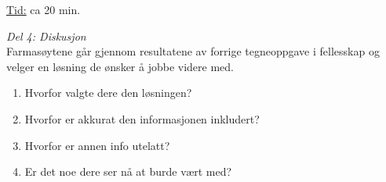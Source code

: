 \underline{Tid:} ca 20 min. 

\textit{Del 4: Diskusjon} \\
Farmasøytene går gjennom resultatene av forrige tegneoppgave i fellesskap og velger en løsning de ønsker å jobbe videre med. 
\begin{enumerate}
\item Hvorfor valgte dere den løsningen?
\item Hvorfor er akkurat den informasjonen inkludert?
\item Hvorfor er annen info utelatt?
\item Er det noe dere ser nå at burde vært med?
\end{enumerate}
